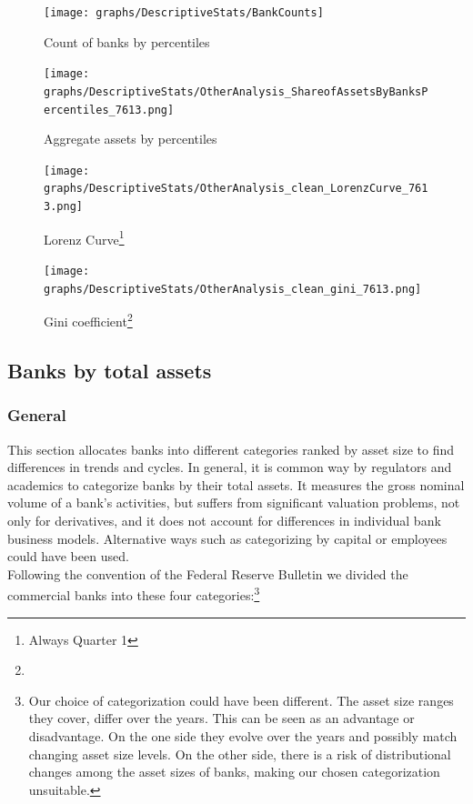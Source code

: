 \documentclass[12pt, a4paper]{article} %
\begin{document}
\begin{figure}[hbtp]
\centering
\caption{Count of banks by percentiles}
\texttt{[image: graphs/DescriptiveStats/BankCounts]}
\label{table:assetsByPercentiles}
\end{figure}


\begin{figure}[hbtp]
\centering
\caption{Aggregate assets by percentiles}
\texttt{[image: graphs/DescriptiveStats/OtherAnalysis\_ShareofAssetsByBanksPercentiles\_7613.png]}
\label{fig:assetsByPercentiles}
\end{figure}


\begin{figure}[hbtp]
\begin{minipage}{\textwidth}
\centering
\caption[1]{Lorenz Curve\footnote{Always Quarter 1} }
\texttt{[image: graphs/DescriptiveStats/OtherAnalysis\_clean\_LorenzCurve\_7613.png]}
\label{fig:lorenz}
\end{minipage}
\end{figure}


\begin{figure}[hbtp]
\begin{minipage}{\textwidth}
\centering
\caption[1]{Gini coefficient\footnote{} }
\texttt{[image: graphs/DescriptiveStats/OtherAnalysis\_clean\_gini\_7613.png]}
\label{fig:gini}
\end{minipage}
\end{figure}




\subsection{Banks by total assets}
\label{sec:banksByAssetSize}

\subsubsection{General}

This section allocates banks into different categories ranked by asset size to find differences in trends and cycles. In general, it is common way by regulators and academics to categorize banks by their total assets. It measures the gross nominal volume of a bank’s activities, but suffers from significant valuation problems, not only for derivatives, and it does not account for differences in individual bank business models. Alternative ways such as categorizing by capital or employees could have been used. \\
Following the convention of the Federal Reserve Bulletin we divided the commercial banks into these four categories:\footnote{Our choice of categorization could have been different. The asset size ranges they cover, differ over the years. This can be seen as an advantage or disadvantage. On the one side they evolve over the years and possibly match changing asset size levels. On the other side, there is a risk of distributional changes among the asset sizes of banks, making our chosen categorization unsuitable. }
\end{document}
